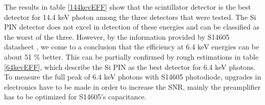 \par
The results in table \ref{144kevEFF} show that the scintillator detector is the best detector for 14.4 keV photon among the three detectors that were tested. The Si PIN detector does not excel in detection of these energies and can be classified as the worst of the three. However, by the information provided by S14605 datasheet \cite{datS14605}, we come to a conclusion that the efficiency at 6.4 keV energies can be about 51 $\%$ better. This can be partially confirmed by rough estimations in table \ref{64kevEFF}, which describe the Si PIN as the best detector for 6.4 keV photons. To measure the full peak of 6.4 keV photons with S14605 photodiode, upgrades in electronics have to be made in order to increase the SNR, mainly the preamplifier has to be optimized for S14605's capacitance.



